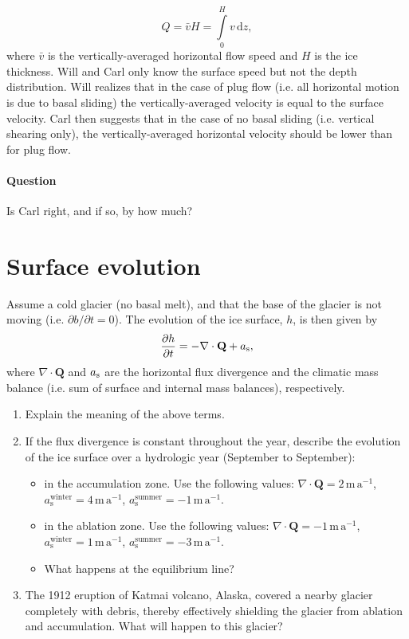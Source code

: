 \documentclass[parskip=half]{scrartcl}
\begin{document}
\begin{equation}
Q = \bar v H = \int \limits_0^H v\, \mathrm{d}z,
\end{equation}
where $\bar v$ is the vertically-averaged horizontal flow speed and $H$ is the ice thickness. Will and Carl only know the surface speed but not the depth distribution. Will realizes that in the case of plug flow (i.e. all horizontal motion is due to basal sliding) the vertically-averaged velocity is equal to the surface velocity. Carl then suggests that in the case of no basal sliding (i.e. vertical shearing only), the vertically-averaged horizontal velocity should be lower than for plug flow.

\paragraph{Question} Is Carl right, and if so, by how much?

\section{Surface evolution}

Assume a cold glacier (no basal melt), and that the base of the glacier is not moving (i.e. $\partial b / \partial t = 0$). The evolution of the ice surface, $h$, is then given by
\begin{equation} \label{eq:upper-surface-evolution}
\frac{\partial h}{\partial t} = - \nabla \cdot \mathbf{Q} + a_{\textrm s},
\end{equation}
where $\nabla \cdot \mathbf{Q}$ and $a_{\textrm s}$ are the horizontal flux divergence and the climatic mass balance (i.e. sum of surface and internal mass balances), respectively.
\begin{enumerate}
\item Explain the meaning of the above terms.
\item If the flux divergence is constant throughout the year, describe the evolution of the ice surface over a hydrologic year (September to September):
  \begin{itemize}
    \item in the accumulation zone. Use the following values: $\nabla \cdot \mathbf{Q} = 2\,\text{m}\,\text{a}^{-1}$, $a_{\text{s}}^{\text{winter}}= 4\,\text{m}\,\text{a}^{-1}$, $a_{\text{s}}^{\text{summer}} = -1\,\text{m}\,\text{a}^{-1}$.
    \item in the ablation zone. Use the following values: $\nabla \cdot \mathbf{Q} = -1\,\text{m}\,\text{a}^{-1}$, $a_{\text{s}}^{\text{winter}}= 1\,\text{m}\,\text{a}^{-1}$, $a_{\text{s}}^{\text{summer}} = -3\,\text{m}\,\text{a}^{-1}$.
    \item What happens at the equilibrium line?
  \end{itemize}
\item The 1912 eruption of Katmai volcano, Alaska, covered a nearby glacier completely with debris, thereby effectively shielding the glacier from ablation and accumulation. What will happen to this glacier? 
\end{enumerate}
\end{document}
